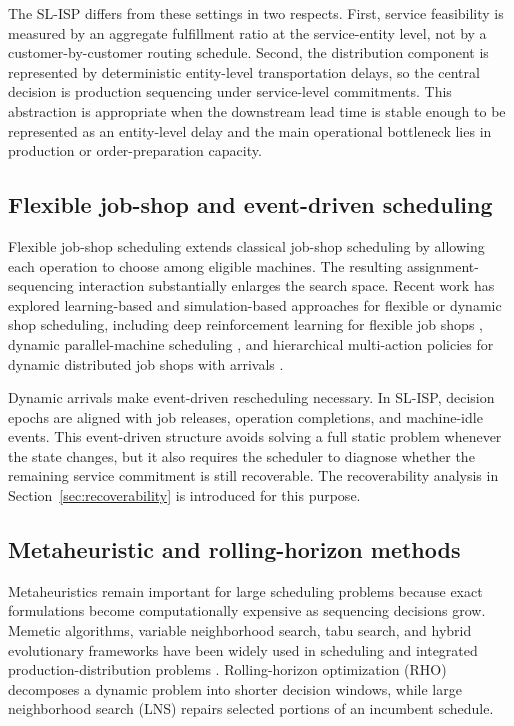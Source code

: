 \documentclass[a4paper,fleqn]{cas-sc}
\begin{document}
The SL-ISP differs from these settings in two respects. First, service feasibility is measured by an aggregate fulfillment ratio at the service-entity level, not by a customer-by-customer routing schedule. Second, the distribution component is represented by deterministic entity-level transportation delays, so the central decision is production sequencing under service-level commitments. This abstraction is appropriate when the downstream lead time is stable enough to be represented as an entity-level delay and the main operational bottleneck lies in production or order-preparation capacity.

\subsection{Flexible job-shop and event-driven scheduling}
\label{sec:lit_fjsp}

Flexible job-shop scheduling extends classical job-shop scheduling by allowing each operation to choose among eligible machines. The resulting assignment-sequencing interaction substantially enlarges the search space. Recent work has explored learning-based and simulation-based approaches for flexible or dynamic shop scheduling, including deep reinforcement learning for flexible job shops \citep{yuan_solving_2024}, dynamic parallel-machine scheduling \citep{liu2023dynamic}, and hierarchical multi-action policies for dynamic distributed job shops with arrivals \citep{huang2024hierarchical}.

Dynamic arrivals make event-driven rescheduling necessary. In SL-ISP, decision epochs are aligned with job releases, operation completions, and machine-idle events. This event-driven structure avoids solving a full static problem whenever the state changes, but it also requires the scheduler to diagnose whether the remaining service commitment is still recoverable. The recoverability analysis in Section~\ref{sec:recoverability} is introduced for this purpose.

\subsection{Metaheuristic and rolling-horizon methods}
\label{sec:lit_metaheuristics}

Metaheuristics remain important for large scheduling problems because exact formulations become computationally expensive as sequencing decisions grow. Memetic algorithms, variable neighborhood search, tabu search, and hybrid evolutionary frameworks have been widely used in scheduling and integrated production-distribution problems \citep{burke2005design,arora2016meta,hou_knowledge-driven_2023}. Rolling-horizon optimization (RHO) decomposes a dynamic problem into shorter decision windows, while large neighborhood search (LNS) repairs selected portions of an incumbent schedule.
\end{document}
